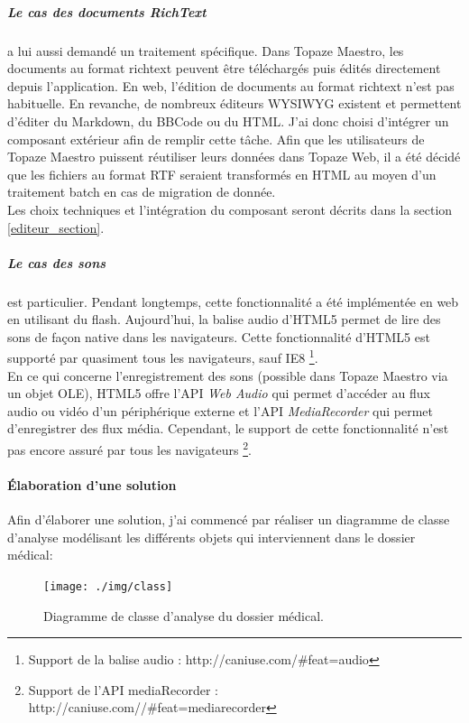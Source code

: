 \subparagraph*{Le cas des documents RichText} a lui aussi demandé un traitement spécifique. Dans Topaze Maestro, les documents au format richtext peuvent être téléchargés puis édités directement depuis l'application. En web, l'édition de documents au format richtext n'est pas habituelle. En revanche, de nombreux éditeurs \gls{WYSIWYG} existent et permettent d'éditer du Markdown, du BBCode ou du HTML. J'ai donc choisi d'intégrer un composant extérieur afin de remplir cette tâche. Afin que les utilisateurs de Topaze Maestro puissent réutiliser leurs données dans Topaze Web, il a été décidé que les fichiers au format RTF seraient transformés en HTML au moyen d'un traitement batch en cas de migration de donnée. \\
Les choix techniques et l'intégration du composant seront décrits dans la section \ref{editeur_section}.

\subparagraph*{Le cas des sons} est particulier. Pendant longtemps, cette fonctionnalité a été implémentée en web en utilisant du flash. Aujourd'hui, la balise audio d'HTML5 permet de lire des sons de façon native dans les navigateurs. Cette fonctionnalité d'HTML5 est supporté par quasiment tous les navigateurs, sauf IE8 \footnote{Support de la balise audio : http://caniuse.com/\#feat=audio}. \\
En ce qui concerne l'enregistrement des sons (possible dans Topaze Maestro via un objet OLE), HTML5 offre l'API \textit{Web Audio}\cite{bib:webaudio} qui permet d'accéder au flux audio ou vidéo d'un périphérique externe et l'API \textit{MediaRecorder}\cite{bib:mediarecorder} qui permet d'enregistrer des flux média. Cependant, le support de cette fonctionnalité n'est pas encore assuré par tous les navigateurs \footnote{Support de l'API mediaRecorder : http://caniuse.com//\#feat=mediarecorder}. 

\paragraph{Élaboration d'une solution\\}
Afin d'élaborer une solution, j'ai commencé par réaliser un diagramme de classe d'analyse modélisant les différents objets qui interviennent dans le dossier médical:

\begin{figure}[H]
  \centering
  \texttt{[image: ./img/class]}
  \caption{\label{fig:mb_va_ast} Diagramme de classe d'analyse du dossier médical.}
\end{figure}

